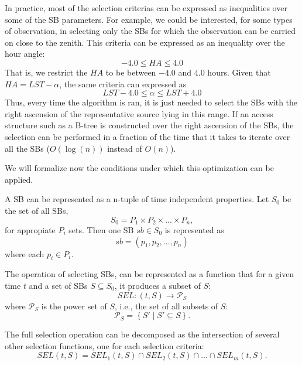 \documentclass{article}
\begin{document}
In practice, most of the selection criterias can be expressed as inequalities over some
of the SB parameters. For example, we could be interested, for some types of observation,
in selecting only the SBs for which the observation can be carried on close to the zenith.
This criteria can be expressed as an inequality over the hour angle:
$$
-4.0 \leq HA \leq 4.0
$$ 
That is, we restrict the $HA$ to be between $-4.0$ and $4.0$ hours. Given that
$HA = LST - \alpha$, the same criteria can expressed as
$$
LST - 4.0 \leq \alpha \leq LST + 4.0
$$
Thus, every time the algorithm is ran, it is just needed to select the SBs with
the right ascension of the representative source lying in this range. If an access
structure such as a B-tree is constructed over the right ascension of the SBs,
the selection can be performed in a fraction of the time that it takes to
iterate over all the SBs ($O(\log(n))$ instead of $O(n)$).

We will formalize now the conditions under which this optimization can be applied.

A SB can be represented as a n-tuple of time independent properties. Let $S_0$ be the
set of all SBs,
$$
S_0 = P_1 \times P_2 \times ... \times P_n, 
$$
for appropiate $P_i$ sets. Then one SB $sb \in S_0$ is represented as
$$
sb = (p_1, p_2,..., p_n)
$$
where each $p_i \in P_i$.

The operation of selecting SBs, can be represented as a function that for a given time
$t$ and a set of SBs $S \subseteq S_0$, it produces a subset of $S$:
$$
SEL: (t, S) \rightarrow \mathcal{P}_S
$$ 
where $\mathcal{P}_S$ is the power set of $S$, i.e., the set of all subsets of $S$:
$$
\mathcal{P}_S = \left \{ S' \mid S' \subseteq S \right \}.
$$

The full selection operation can be decomposed as the intersection of
several other selection functions, one for each selection criteria:
$$
SEL(t,S) = SEL_1(t,S) \cap SEL_2(t,S) \cap ... \cap SEL_m(t,S).
$$
\end{document}
